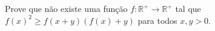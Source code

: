 Prove que não existe uma função \(f\colon  \mathbb{R}^+\to\mathbb{R}^+\) tal que \(f(x)^2\ge f(x+y)\left(f(x)+y\right)\) para todos \(x,y>0\).
